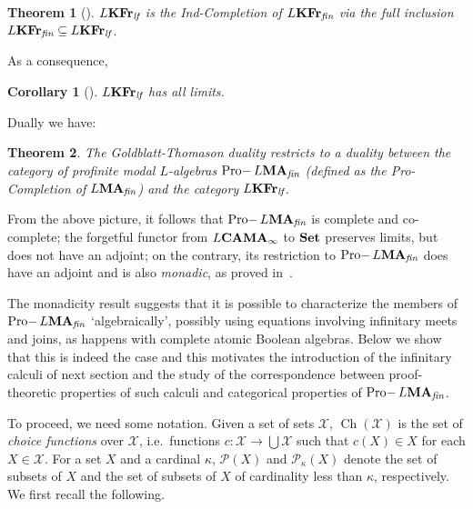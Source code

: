 \documentclass{article}
\newtheorem{thm}{Theorem}
\newtheorem{cor}{Corollary}
\theoremstyle{definition}
\DeclareMathOperator{\Ch}{Ch}
\DeclareMathOperator{\Pro}{Pro-}
\newcommand{\KFr}{\textup{\textbf{KFr}}}
\newcommand{\MA}{\textup{\textbf{MA}}}
\newcommand{\CAMA}{\textup{\textbf{CAMA}}}
\newcommand{\fin}{\textit{fin}}
\newcommand{\lf}{\textit{lf}}
\newcommand{\Set}{\textup{\textbf{Set}}}
\begin{document}
\begin{thm}[\cite{MDB-SG}]\label{thm:ind}
$L\KFr_{\lf}$ is the Ind-Completion of $L\KFr_{\fin}$ via the full inclusion $L\KFr_{\fin}\subseteq L\KFr_{\lf}$.
\end{thm}

As a consequence,
\begin{cor}[\cite{MDB-SG}]\label{cor:lim}
$L\KFr_\lf$ has all limits.
\end{cor}

Dually we have:
\begin{thm}\label{thm:produality} The Goldblatt-Thomason duality restricts to a duality between the category of profinite modal $L$-algebras $\Pro L\MA_\fin$ (defined as the Pro-Completion of $L\MA_\fin$) and the category  $L\KFr_\lf$.
\end{thm}

From the above picture, it follows that $\Pro L\MA_\fin$ is complete and co-complete; the forgetful functor from $L\CAMA_\infty$ to $\Set$ preserves limits, but does not have an adjoint; on the contrary, its restriction to $\Pro L\MA_\fin$  does have an adjoint and is also \emph{monadic}, as proved in~\cite{MDB-SG}.

The monadicity result suggests that it is possible to characterize the members of $\Pro L\MA_\fin$ `algebraically', possibly using equations involving infinitary meets and joins, as happens with complete atomic Boolean algebras. Below we show that this is indeed the case and this motivates the introduction of the infinitary calculi of next section and the study of the correspondence between proof-theoretic properties of such calculi and categorical properties of $\Pro L\MA_\fin$.

To proceed, we need some notation. Given a set of sets $\mathscr{X}$, $\Ch(\mathscr{X})$ is the set of \emph{choice functions} over $\mathscr{X}$, i.e.\ functions $c \colon \mathscr{X} \longrightarrow \bigcup \mathscr{X}$ such that $c(X) \in X$ for each $X \in \mathscr{X}$. For a set $X$ and a cardinal $\kappa$, $\mathcal{P}(X)$ and $\mathcal{P}_\kappa(X)$ denote the set of subsets of $X$ and the set of subsets of $X$ of cardinality less than $\kappa$, respectively.
We first recall the following.
 
\end{document}
